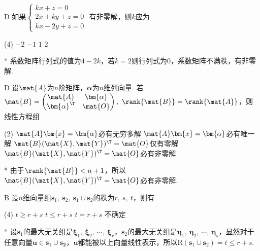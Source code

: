 \begin{choice}{D}
    如果$\begin{cases}
        kx+z=0\\
        2x+ky+z=0\\
        kx-2y+z=0
    \end{cases}$
    有非零解，则$k$应为
\begin{tasks}(4)
    \task $-2$
    \task $-1$
    \task $1$
    \task $2$
\end{tasks}
\end{choice}
\begin{solution}*
    系数矩阵行列式的值为$4-2k$，若$k=2$则行列式为$0$，系数矩阵不满秩，有非零解. 
\end{solution}

\begin{choice}{D}
    设$\mat{A}$为$n$阶矩阵，$\bm{\alpha}$为$n$维列向量. 若$\mat{B}=\begin{pmatrix}
        \mat{A} & \bm{\alpha}\\\bm{\alpha}^\T & \mat{O}
    \end{pmatrix},\ \rank{\mat{B}}=\rank{\mat{A}}$，则线性方程组
\begin{tasks}(2)
    \task $\mat{A}\bm{x}=\bm{\alpha}$必有无穷多解
    \task $\mat{A}\bm{x}=\bm{\alpha}$必有唯一解
    \task $\mat{B}(\mat{X},\mat{Y})^\T=\mat{O}$仅有零解
    \task $\mat{B}(\mat{X},\mat{Y})^\T=\mat{O}$必有非零解
\end{tasks}
\end{choice}
\begin{solution}*
    由于$\rank{\mat{B}}<n+1$，所以$\mat{B}(\mat{X},\mat{Y})^\T=\mat{O}$必有非零解.
\end{solution}

\begin{choice}{B}
    设$n$维向量组$\bm{s}_1,\ \bm{s}_2,\ \bm{s}_1\cup\bm{s}_2$的秩为$r,\ s,\ t$，则有
\begin{tasks}(4)
    \task $t\geq r+s$
    \task $t\leq r+s$
    \task $t=r+s$
    \task 不确定
\end{tasks}
\end{choice}
\begin{solution}*
    设$\bm{s}_1$的最大无关组是$\bm{\xi}_1,\ \bm{\xi}_2,\ \cdots,\ \bm{\xi}_r$，$\bm{s}_2$的最大无关组是$\bm{\eta}_1,\ \bm{\eta}_2,\ \cdots,\ \bm{\eta}_s$，显然对于任意向量$\bm{u}\in\bm{s}_1\cup\bm{s_2}$，$\bm{u}$都能被以上向量线性表示，所以$\mathrm{R}(\bm{s}_1\cup\bm{s}_2)=t\leq r+s$.
\end{solution}

